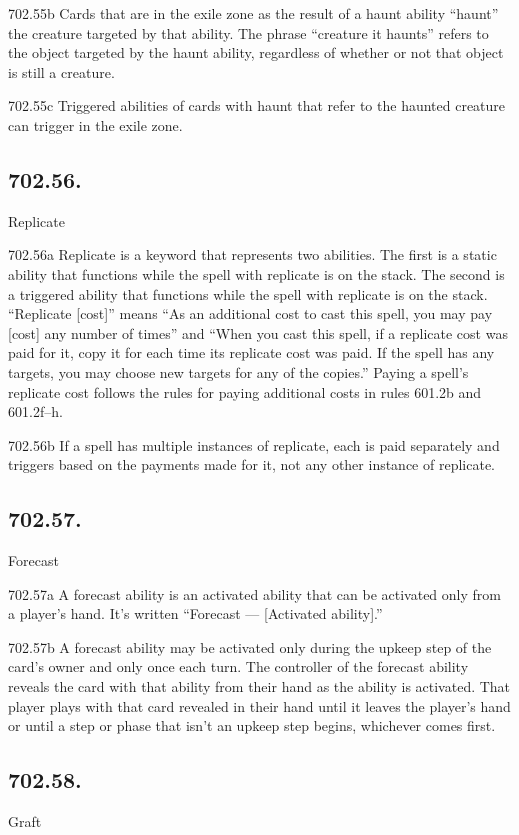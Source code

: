 702.55b Cards that are in the exile zone as the result of a haunt ability “haunt” the creature targeted by that ability. The phrase “creature it haunts” refers to the object targeted by the haunt ability, regardless of whether or not that object is still a creature.

702.55c Triggered abilities of cards with haunt that refer to the haunted creature can trigger in the exile zone.

\subsection*{702.56.}
Replicate

702.56a Replicate is a keyword that represents two abilities. The first is a static ability that functions while the spell with replicate is on the stack. The second is a triggered ability that functions while the spell with replicate is on the stack. “Replicate [cost]” means “As an additional cost to cast this spell, you may pay [cost] any number of times” and “When you cast this spell, if a replicate cost was paid for it, copy it for each time its replicate cost was paid. If the spell has any targets, you may choose new targets for any of the copies.” Paying a spell’s replicate cost follows the rules for paying additional costs in rules 601.2b and 601.2f–h.

702.56b If a spell has multiple instances of replicate, each is paid separately and triggers based on the payments made for it, not any other instance of replicate.

\subsection*{702.57.}
Forecast

702.57a A forecast ability is an activated ability that can be activated only from a player’s hand. It’s written “Forecast — [Activated ability].”

702.57b A forecast ability may be activated only during the upkeep step of the card’s owner and only once each turn. The controller of the forecast ability reveals the card with that ability from their hand as the ability is activated. That player plays with that card revealed in their hand until it leaves the player’s hand or until a step or phase that isn’t an upkeep step begins, whichever comes first.

\subsection*{702.58.}
Graft


